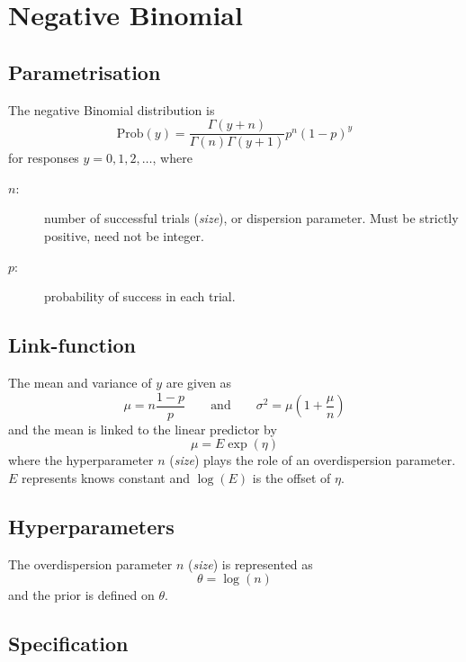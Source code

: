 \documentclass[a4paper,11pt]{article}
\begin{document}
\section*{Negative Binomial}

\subsection*{Parametrisation}

The negative Binomial distribution is
\begin{displaymath}
    \text{Prob}(y) = \frac{\Gamma(y+n)}{\Gamma(n) \Gamma(y+1)} p^n (1-p)^y
\end{displaymath}
for responses $y=0, 1, 2, \ldots$, where
\begin{description}
\item[$n$:] number of successful trials (\emph{size}), or dispersion
    parameter. Must be strictly positive, need not be integer.
\item[$p$:] probability of success in each trial.
\end{description}

\subsection*{Link-function}

The mean and variance of $y$ are given as
\begin{displaymath}
    \mu = n \frac{1-p}{p} \qquad\text{and}\qquad \sigma^{2} = \mu(1 + \frac{\mu}{n})
\end{displaymath}
and the mean is linked to the linear predictor by
\begin{displaymath}
    \mu = E \exp(\eta)
\end{displaymath}
where the hyperparameter $n$ (\emph{size}) plays the role of an
overdispersion parameter. $E$ represents knows constant and $\log(E)$
is the offset of $\eta$.

\subsection*{Hyperparameters}

The overdispersion parameter $n$ (\emph{size}) is represented as
\begin{displaymath}
    \theta = \log(n)
\end{displaymath}
and the prior is defined on $\theta$. 

\subsection*{Specification}
\end{document}
